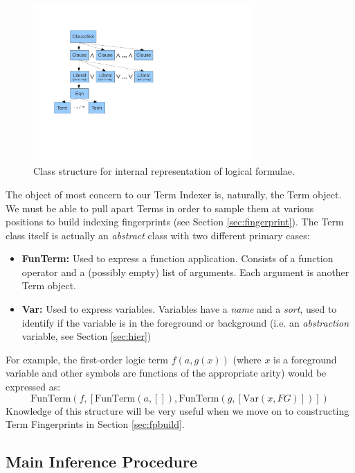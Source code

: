 \begin{figure}[H]
  \centering
  \includegraphics[clip,trim=2.5cm 5cm 13cm 2cm,width=0.75\textwidth]{resources/logicstructure}
  \caption
   {Class structure for internal representation of logical formulae.}
   \label{fig:expressions}
\end{figure}

The object of most concern to our Term Indexer is, naturally, the Term object.
We must be able to pull apart Terms in order to sample them at various positions
to build indexing fingerprints (see Section \ref{sec:fingerprint}). The Term
class itself is actually an \emph{abstract} class with two different primary cases:
\begin{itemize}
\item[] \textbf{FunTerm:} Used to express a function application. Consists of
a function operator and a (possibly empty) list of arguments. Each argument
is another Term object.
\item[] \textbf{Var:} Used to express variables. Variables have a \emph{name}
and a \emph{sort}, used to identify if the variable is in the foreground
or background (i.e. an \emph{abstraction} variable, see Section \ref{sec:hier})
\end{itemize}

For example, the first-order logic term $f(a, g(x))$ (where $x$ is a foreground
variable and other symbols are functions of the appropriate arity) would be expressed as:
\[\text{FunTerm}(f, [\text{FunTerm}(a, []), \text{FunTerm}(g, [\text{Var}(x, FG)])] )\]
Knowledge of this structure will be very useful when we move on to constructing
Term Fingerprints in Section \ref{sec:fpbuild}.

\subsection{Main Inference Procedure}

